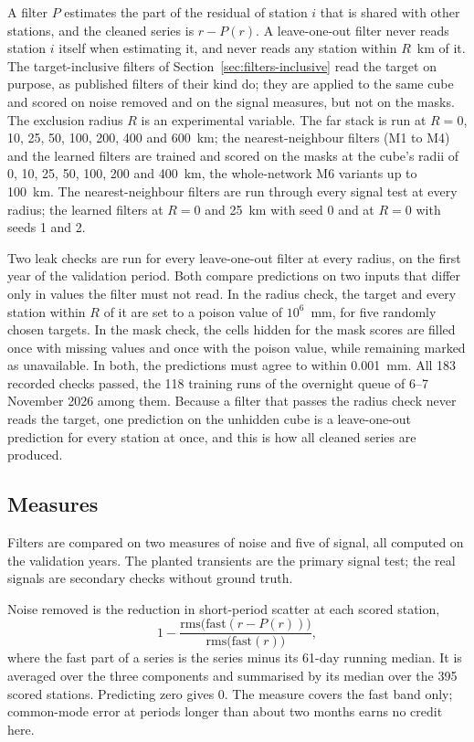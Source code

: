 \documentclass[preprint,12pt,authoryear]{elsarticle}
\begin{document}
A filter $P$ estimates the part of the residual of station $i$ that is shared with other stations, and the cleaned series is $r - P(r)$. A leave-one-out filter never reads station $i$ itself when estimating it, and never reads any station within $R$~km of it. The target-inclusive filters of Section~\ref{sec:filters-inclusive} read the target on purpose, as published filters of their kind do; they are applied to the same cube and scored on noise removed and on the signal measures, but not on the masks. The exclusion radius $R$ is an experimental variable. The far stack is run at $R = 0$, 10, 25, 50, 100, 200, 400 and 600~km; the nearest-neighbour filters (M1 to M4) and the learned filters are trained and scored on the masks at the cube's radii of 0, 10, 25, 50, 100, 200 and 400~km, the whole-network M6 variants up to 100~km. The nearest-neighbour filters are run through every signal test at every radius; the learned filters at $R = 0$ and 25~km with seed 0 and at $R = 0$ with seeds 1 and 2.

Two leak checks are run for every leave-one-out filter at every radius, on the first year of the validation period. Both compare predictions on two inputs that differ only in values the filter must not read. In the radius check, the target and every station within $R$ of it are set to a poison value of $10^6$~mm, for five randomly chosen targets. In the mask check, the cells hidden for the mask scores are filled once with missing values and once with the poison value, while remaining marked as unavailable. In both, the predictions must agree to within 0.001~mm. All 183 recorded checks passed, the 118 training runs of the overnight queue of 6--7 November 2026 among them. Because a filter that passes the radius check never reads the target, one prediction on the unhidden cube is a leave-one-out prediction for every station at once, and this is how all cleaned series are produced.

\subsection{Measures}
\label{sec:measures}

Filters are compared on two measures of noise and five of signal, all computed on the validation years. The planted transients are the primary signal test; the real signals are secondary checks without ground truth.

Noise removed is the reduction in short-period scatter at each scored station,
\begin{equation}
  1 - \frac{\mathrm{rms}\big(\mathrm{fast}(r - P(r))\big)}{\mathrm{rms}\big(\mathrm{fast}(r)\big)},
  \label{eq:noise}
\end{equation}
where the fast part of a series is the series minus its 61-day running median. It is averaged over the three components and summarised by its median over the 395 scored stations. Predicting zero gives 0. The measure covers the fast band only; common-mode error at periods longer than about two months earns no credit here.
\end{document}
